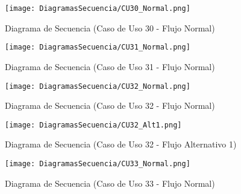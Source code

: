 \begin{landscape}
  \label{fig:Secuencia_CU30_Normal}
  \vspace*{\fill}
  \begin{figure}[!htbp]
    \centering
    \texttt{[image: DiagramasSecuencia/CU30\_Normal.png]}
    \caption{Diagrama de Secuencia (Caso de Uso 30 - Flujo Normal)}
  \end{figure}
  \vfill
\end{landscape}
\FloatBarrier

\begin{landscape}
  \label{fig:Secuencia_CU31_Normal}
  \vspace*{\fill}
  \begin{figure}[!htbp]
    \centering
    \texttt{[image: DiagramasSecuencia/CU31\_Normal.png]}
    \caption{Diagrama de Secuencia (Caso de Uso 31 - Flujo Normal)}
  \end{figure}
  \vfill
\end{landscape}
\FloatBarrier

\begin{landscape}
  \label{fig:Secuencia_CU32_Normal}
  \vspace*{\fill}
  \begin{figure}[!htbp]
    \centering
    \texttt{[image: DiagramasSecuencia/CU32\_Normal.png]}
    \caption{Diagrama de Secuencia (Caso de Uso 32 - Flujo Normal)}
  \end{figure}
  \vfill
\end{landscape}
\FloatBarrier

\begin{landscape}
  \label{fig:Secuencia_CU32_Alt1}
  \vspace*{\fill}
  \begin{figure}[!htbp]
    \centering
    \texttt{[image: DiagramasSecuencia/CU32\_Alt1.png]}
    \caption{Diagrama de Secuencia (Caso de Uso 32 - Flujo Alternativo 1)}
  \end{figure}
  \vfill
\end{landscape}
\FloatBarrier

\begin{landscape}
  \label{fig:Secuencia_CU33_Normal}
  \vspace*{\fill}
  \begin{figure}[!htbp]
    \centering
    \texttt{[image: DiagramasSecuencia/CU33\_Normal.png]}
    \caption{Diagrama de Secuencia (Caso de Uso 33 - Flujo Normal)}
  \end{figure}
  \vfill
\end{landscape}
\FloatBarrier


